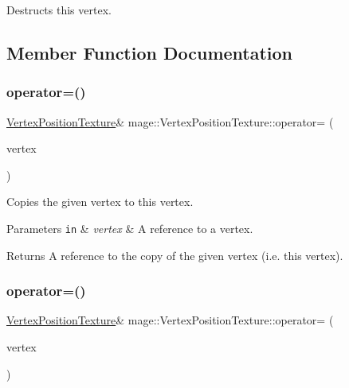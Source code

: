 Destructs this vertex. 

\subsection{Member Function Documentation}
\hypertarget{structmage_1_1_vertex_position_texture_adae15e832eaf7624c32865a11d0d8234}{}\label{structmage_1_1_vertex_position_texture_adae15e832eaf7624c32865a11d0d8234} 
\subsubsection{\texorpdfstring{operator=()}{operator=()}\hspace{0.1cm}{\footnotesize\ttfamily [1/2]}}
{\footnotesize\ttfamily \hyperlink{structmage_1_1_vertex_position_texture}{Vertex\+Position\+Texture}\& mage\+::\+Vertex\+Position\+Texture\+::operator= (\begin{DoxyParamCaption}\item[{const \hyperlink{structmage_1_1_vertex_position_texture}{Vertex\+Position\+Texture} \&}]{vertex }\end{DoxyParamCaption})\hspace{0.3cm}{\ttfamily [default]}}

Copies the given vertex to this vertex.


\begin{DoxyParams}[1]{Parameters}
\mbox{\tt in}  & {\em vertex} & A reference to a vertex. \\
\hline
\end{DoxyParams}
\begin{DoxyReturn}{Returns}
A reference to the copy of the given vertex (i.\+e. this vertex). 
\end{DoxyReturn}
\hypertarget{structmage_1_1_vertex_position_texture_abced707921e05755382566dcfa876a7a}{}\label{structmage_1_1_vertex_position_texture_abced707921e05755382566dcfa876a7a} 
\subsubsection{\texorpdfstring{operator=()}{operator=()}\hspace{0.1cm}{\footnotesize\ttfamily [2/2]}}
{\footnotesize\ttfamily \hyperlink{structmage_1_1_vertex_position_texture}{Vertex\+Position\+Texture}\& mage\+::\+Vertex\+Position\+Texture\+::operator= (\begin{DoxyParamCaption}\item[{\hyperlink{structmage_1_1_vertex_position_texture}{Vertex\+Position\+Texture} \&\&}]{vertex }\end{DoxyParamCaption})\hspace{0.3cm}{\ttfamily [default]}}

